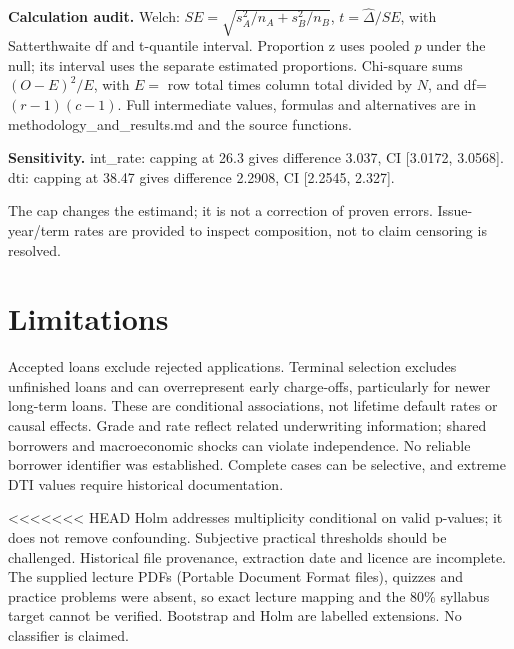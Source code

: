 \documentclass[10pt,a4paper,twocolumn]{article}
\begin{document}
\textbf{Calculation audit.} Welch: $SE=\sqrt{s_A^2/n_A+s_B^2/n_B}$, $t=\hat\Delta/SE$, with Satterthwaite df and t-quantile interval. Proportion z uses pooled $p$ under the null; its interval uses the separate estimated proportions. Chi-square sums $(O-E)^2/E$, with $E=$ row total times column total divided by $N$, and df=$(r-1)(c-1)$. Full intermediate values, formulas and alternatives are in methodology\_and\_results.md and the source functions.

\textbf{Sensitivity.}
 int\_rate: capping at 26.3 gives difference 3.037, CI [3.0172, 3.0568].
 dti: capping at 38.47 gives difference 2.2908, CI [2.2545, 2.327].

The cap changes the estimand; it is not a correction of proven errors. Issue-year/term rates are provided to inspect composition, not to claim censoring is resolved.
\section{Limitations}
Accepted loans exclude rejected applications. Terminal selection excludes unfinished loans and can overrepresent early charge-offs, particularly for newer long-term loans. These are conditional associations, not lifetime default rates or causal effects. Grade and rate reflect related underwriting information; shared borrowers and macroeconomic shocks can violate independence. No reliable borrower identifier was established. Complete cases can be selective, and extreme DTI values require historical documentation.

<<<<<<< HEAD
Holm addresses multiplicity conditional on valid p-values; it does not remove confounding. Subjective practical thresholds should be challenged. Historical file provenance, extraction date and licence are incomplete. The supplied lecture PDFs (Portable Document Format files), quizzes and practice problems were absent, so exact lecture mapping and the 80\% syllabus target cannot be verified. Bootstrap and Holm are labelled extensions. No classifier is claimed.
\end{document}
